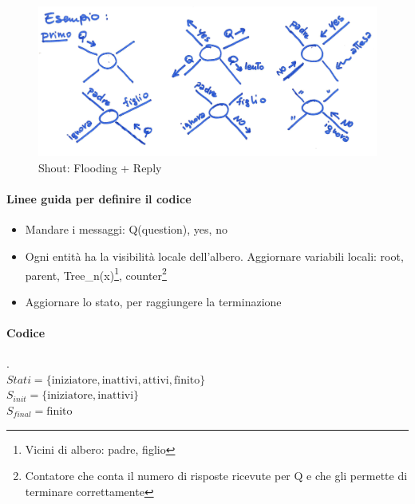 \begin{figure}[h]
    \centering
    \includegraphics[scale=0.4]{images/protocollo_shout.png}
    \caption{Shout: Flooding + Reply}
    \label{fig:my_label}
\end{figure}

\paragraph{Linee guida per definire il codice}
\begin{itemize}
    \item Mandare i messaggi: Q(question), yes, no
    \item Ogni entità ha la visibilità locale dell'albero. Aggiornare variabili locali: root, parent, Tree\_n(x)\footnote{Vicini di albero: padre, figlio}, counter\footnote{Contatore che conta il numero di risposte ricevute per Q e che gli permette di terminare correttamente}
    \item Aggiornare lo stato, per raggiungere la terminazione
\end{itemize}

\paragraph{Codice}
.\\$Stati = \{\text{iniziatore}, \text{inattivi}, \text{attivi}, \text{finito}\}$\\
$S_{init} = \{\text{iniziatore}, \text{inattivi}\}$\\
$S_{final} = \text{finito}$

